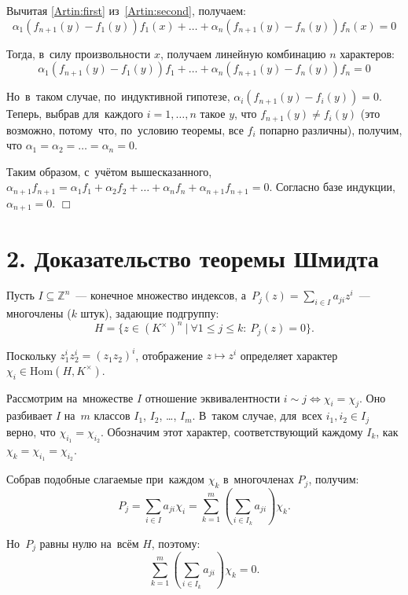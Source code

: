 \documentclass[twoside]{article}
\begin{document}
    Вычитая \eqref{Artin:first} из~\eqref{Artin:second}, получаем:
    $$
        \alpha_1 (f_{n + 1}(y) - f_1(y)) f_1(x) + \ldots + \alpha_n (f_{n + 1}(y) - f_n(y)) f_n(x) = 0
    $$

    Тогда, в~силу произвольности $x$, получаем линейную комбинацию $n$ характеров:
    $$
        \alpha_1 (f_{n + 1}(y) - f_1(y)) f_1 + \ldots + \alpha_n (f_{n + 1}(y) - f_n(y)) f_n = 0
    $$

    Но~в~таком случае, по~индуктивной гипотезе, $\alpha_i (f_{n + 1}(y) - f_i(y)) = 0$.
    Теперь, выбрав для~каждого $i = 1, \ldots, n$ такое $y$, что $f_{n + 1}(y) \neq f_i(y)$
    (это возможно, потому~что, по~условию теоремы, все $f_i$ попарно различны), получим,
    что $\alpha_1 = \alpha_2 = \ldots = \alpha_n = 0$.

    Таким образом, с~учётом вышесказанного, $\alpha_{n + 1} f_{n + 1} = \alpha_1 f_1 + \alpha_2 f_2 + \ldots + \alpha_n f_n + \alpha_{n + 1} f_{n + 1} = 0$.
    Согласно базе индукции, $\alpha_{n + 1} = 0$.
\hfill$\Box$

\section*{2. Доказательство теоремы Шмидта}

    Пусть $I \subseteq \mathbb{Z}^n$~— конечное множество индексов,
    а~$P_j(z) = \sum_{i \in I} a_{ji} z^i$~— многочлены ($k$ штук), задающие подгруппу:
    $$
        H = \{ z \in (K^{\times})^n\ |\ \forall 1 \leq j \leq k{:}\ P_j(z) = 0 \}.
    $$

    Поскольку $z_1^{i} z_2^{i} = (z_1 z_2)^i$, отображение $z \mapsto z^i$ определяет
    характер $\chi_i \in \mathrm{Hom}(H, K^{\times})$.

    Рассмотрим на~множестве $I$ отношение эквивалентности $i \sim j \Leftrightarrow \chi_i = \chi_j$.
    Оно разбивает $I$ на~$m$ классов $I_1$, $I_2$, …, $I_m$. В~таком случае, для~всех $i_1, i_2 \in I_j$ верно, что $\chi_{i_1} = \chi_{i_2}$.
    Обозначим этот характер, соответствующий каждому $I_k$, как $\chi_k = \chi_{i_1} = \chi_{i_2}$.

    Собрав подобные слагаемые при~каждом $\chi_k$ в~многочленах $P_j$, получим:
    $$
        P_j = \sum_{i \in I} a_{ji} \chi_i = \sum_{k = 1}^{m} \left( \sum_{i \in I_k} a_{ji} \right) \chi_k.
    $$

    Но~$P_j$ равны нулю на~всём $H$, поэтому:
    $$
    \sum_{k = 1}^{m} \left( \sum_{i \in I_k} a_{ji} \right) \chi_k = 0.
    $$
\end{document}
